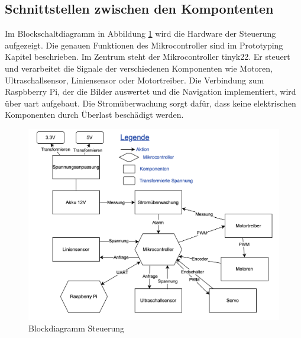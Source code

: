 \newpage

\subsection{Schnittstellen zwischen den Kompontenten}

Im Blockschaltdiagramm in Abbildung \ref{Blockdiagramm Steuerung} wird die Hardware der Steuerung aufgezeigt. Die genauen Funktionen des Mikrocontroller sind im Prototyping Kapitel  beschrieben. Im Zentrum steht der Mikrocontroller \gls{tinyk22}.
Er steuert und verarbeitet die Signale der verschiedenen Komponenten wie Motoren, Ultraschallsensor, Liniensensor oder Motortreiber. Die Verbindung zum Raspbberry Pi, der die Bilder auswertet und die Navigation implementiert, wird über \acrfull{uart} aufgebaut. Die Stromüberwachung sorgt dafür, dass keine elektrischen Komponenten durch Überlast beschädigt werden.


\begin{figure}[H]
    \centering
    \includegraphics[width=1\linewidth]{img/Blockdiagramm-ET-drawio.drawio-2.png}
    \caption{Blockdiagramm Steuerung}
    \label{Blockdiagramm Steuerung}
\end{figure}


